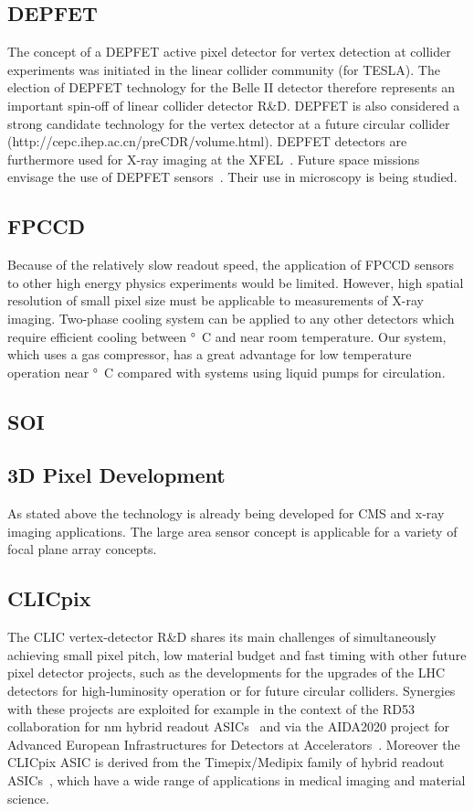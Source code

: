 \subsection{DEPFET}
The concept of a DEPFET active pixel detector for vertex detection at collider experiments was initiated in the linear collider community (for TESLA). The election of DEPFET technology for the Belle II detector therefore represents an important spin-off of linear collider detector R\&D. DEPFET is also considered a strong candidate technology for the vertex detector at a future circular collider (http://cepc.ihep.ac.cn/preCDR/volume.html). DEPFET detectors are furthermore used for X-ray imaging at the XFEL~\cite{xfel}. Future space missions envisage the use of DEPFET sensors~\cite{bepicolombo}. Their use in microscopy is being studied.

\subsection{FPCCD}
    Because of the relatively slow readout speed, the application of FPCCD sensors to other high energy physics experiments would be limited. However, high spatial resolution of small pixel size must be applicable to measurements of X-ray imaging.
    Two-phase  cooling system can be applied to any other detectors which require efficient cooling between \unit[-40]{\degree C} and near room temperature. Our system, which uses a  gas compressor, has a great advantage for low temperature operation near \unit[-40]{\degree C} compared with systems using liquid pumps for circulation.

\subsection{SOI}

\subsection{3D Pixel Development}
As stated above the technology is already being developed for CMS and x-ray imaging applications.  The large area sensor concept is applicable for a variety of focal plane array concepts.

\subsection{CLICpix}
The CLIC vertex-detector R\&D shares its main challenges of simultaneously achieving small pixel pitch,
low material budget and fast timing with other future pixel detector projects, such as the developments for
the upgrades of the LHC detectors for high-luminosity operation or for future circular colliders.
Synergies with these projects are exploited for example in the context of the RD53 collaboration for \unit[65]{nm} hybrid readout
ASICs~\cite{RD53} and via the AIDA2020 project for Advanced European Infrastructures for Detectors at
Accelerators~\cite{AIDA2020}.
Moreover the CLICpix ASIC is derived from the
Timepix/Medipix family of hybrid readout ASICs~\cite{medipix-collaboration}, which have a wide range of applications in
medical imaging and material science.

